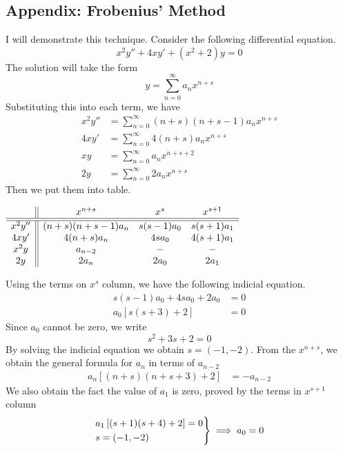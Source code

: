 \documentclass[../../main.tex]{subfiles}
\begin{document}
\subsection*{Appendix: Frobenius' Method}
I will demonstrate this technique. Consider the following differential equation.
\begin{equation*}
  x^2 y''+ 4xy' + (x^2 + 2)y = 0
\end{equation*}
The solution will take the form 
\begin{equation*}
  y=\sum_{n=0}^{\infty} a_nx^{n+s}
\end{equation*}
Substituting this into each term, we have 
\begin{align*}
  x^2y''&=\sum_{n=0}^{\infty} (n+s) (n+s-1)a_nx^{n+s} \\
  4xy'&=\sum_{n=0}^{\infty} 4(n+s) a_nx^{n+s}\\
  xy&=\sum_{n=0}^{\infty} a_n x^{n+s+2}\\
  2y&=\sum_{n=0}^{\infty} 2a_nx^{n+s}
\end{align*}
Then we put them into table.
\begin{center}
$\begin{array}{c || c c c}
  &x^{n+s}&x^s&x^{s+1}\\
  \hline\hline
  x^2y''&(n + s)(n + s - 1)a_n &s(s-1)a_0  &s(s+1)a_1 \\
  4xy'&4(n+s)a_n &4sa_0 &4(s+1)a_1 \\
  x^2y&a_{n-2} &-&- \\
  2y& 2a_n& 2a_0& 2a_1\\
\end{array}$
\end{center}
Using the terms on $x^{s}$ column, we have the following indicial equation.
\begin{align*}
  s(s-1)a_0+4sa_0+2a_0&=0\\
  a_0 \left[s(s+3)+2 \right] &=0
\end{align*}
Since $a_0$ cannot be zero, we write 
\begin{equation*}
  s^2+3s+2 =0
\end{equation*}
By solving the indicial equation we obtain $s=(-1,-2)$. From the $x^{n+s}$, we obtain the general formula for $a_n$ in terms of $a_{n-2}$
\begin{align*}
  a_n\left[(n+s)(n+s+3)+2\right]&=-a_{n-2}
\end{align*}
We also obtain the fact the value of $a_1$ is zero, proved by the terms in $x^{s+1}$ column 
\begin{equation*}
  \begin{rcases*}
    a_1\left[(s+1)(s+4)+2\right]=0\\
    s=(-1,-2)
  \end{rcases*}\implies a_0=0
\end{equation*}
\end{document}
